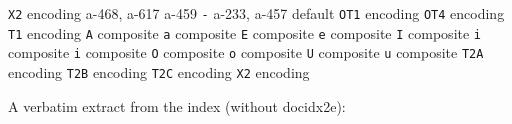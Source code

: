 \documentclass[twoside]{ltxdoc}
\makeatletter
\renewenvironment{theindex}{%
   \@restonecoltrue
   \if@twocolumn\@restonecolfalse\fi
   \columnseprule \z@
   \columnsep 35\p@
   \twocolumn[\index@prologue]%
   \IndexParms
   \let\item\@idxitem
   \ignorespaces
}{\if@restonecol\onecolumn\else\clearpage\fi}
\makeatother
\begin{document}
\begin{theindex}
    \subitem \texttt  {X2} encoding\pfill {}
  \item \texttt  {}\pfill a-468, a-617
  \item \texttt  {}\pfill a-459
  \item \texttt  {\MetaNormalfont {}-}\pfill 
  \item \texttt  {}\pfill a-233, a-457
    \subitem default\pfill {}
    \subitem \texttt  {OT1} encoding\pfill {}
    \subitem \texttt  {OT4} encoding\pfill {}
    \subitem \texttt  {T1} encoding\pfill {}
      \subsubitem \texttt  {A} composite\pfill {}
      \subsubitem \texttt  {a} composite\pfill {}
      \subsubitem \texttt  {E} composite\pfill {}
      \subsubitem \texttt  {e} composite\pfill {}
      \subsubitem \texttt  {I} composite\pfill {}
      \subsubitem \texttt  {i} composite\pfill {}
      \subsubitem \texttt  {i} composite\pfill 
      \subsubitem \texttt  {O} composite\pfill {}
      \subsubitem \texttt  {o} composite\pfill {}
      \subsubitem \texttt  {U} composite\pfill {}
      \subsubitem \texttt  {u} composite\pfill {}
    \subitem \texttt  {T2A} encoding\pfill {}
    \subitem \texttt  {T2B} encoding\pfill {}
    \subitem \texttt  {T2C} encoding\pfill {}
    \subitem \texttt  {X2} encoding\pfill {}
  \begin{figure*}
    A verbatim extract from the index (without \textsf{docidx2e}):
    

\end{figure*}
\end{theindex}
\end{document}
